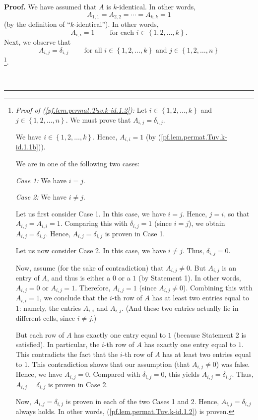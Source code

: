 \documentclass[numbers=enddot,12pt,final,onecolumn,notitlepage]{scrartcl}%
\theoremstyle{definition}
\newenvironment{proof}[1][Proof]{\noindent\textbf{#1.} }{\ \rule{0.5em}{0.5em}}
\begin{document}
\begin{proof}
We have assumed that $A$ is $k$-identical. In other words,%
\begin{equation}
A_{1,1}=A_{2,2}=\cdots=A_{k,k}=1 \label{pf.lem.permat.Tuv.k-id.1.1}%
\end{equation}
(by the definition of \textquotedblleft$k$-identical\textquotedblright). In
other words,%
\begin{equation}
A_{i,i}=1\ \ \ \ \ \ \ \ \ \ \text{for each }i\in\left\{  1,2,\ldots
,k\right\}  . \label{pf.lem.permat.Tuv.k-id.1.1b}%
\end{equation}
Next, we observe that%
\begin{equation}
A_{i,j}=\delta_{i,j}\ \ \ \ \ \ \ \ \ \ \text{for all }i\in\left\{
1,2,\ldots,k\right\}  \text{ and }j\in\left\{  1,2,\ldots,n\right\}
\label{pf.lem.permat.Tuv.k-id.1.2}%
\end{equation}
\footnote{\textit{Proof of (\ref{pf.lem.permat.Tuv.k-id.1.2}):} Let
$i\in\left\{  1,2,\ldots,k\right\}  $ and $j\in\left\{  1,2,\ldots,n\right\}
$. We must prove that $A_{i,j}=\delta_{i,j}$.
\par
We have $i\in\left\{  1,2,\ldots,k\right\}  $. Hence, $A_{i,i}=1$ (by
(\ref{pf.lem.permat.Tuv.k-id.1.1b})).
\par
We are in one of the following two cases:
\par
\textit{Case 1:} We have $i=j$.
\par
\textit{Case 2:} We have $i\neq j$.
\par
Let us first consider Case 1. In this case, we have $i=j$. Hence, $j=i$, so
that $A_{i,j}=A_{i,i}=1$. Comparing this with $\delta_{i,j}=1$ (since $i=j$),
we obtain $A_{i,j}=\delta_{i,j}$. Hence, $A_{i,j}=\delta_{i,j}$ is proven in
Case 1.
\par
Let us now consider Case 2. In this case, we have $i\neq j$. Thus,
$\delta_{i,j}=0$.
\par
Now, assume (for the sake of contradiction) that $A_{i,j}\neq0$. But $A_{i,j}$
is an entry of $A$, and thus is either a $0$ or a $1$ (by Statement 1). In
other words, $A_{i,j}=0$ or $A_{i,j}=1$. Therefore, $A_{i,j}=1$ (since
$A_{i,j}\neq0$). Combining this with $A_{i,i}=1$, we conclude that the $i$-th
row of $A$ has at least two entries equal to $1$: namely, the entries
$A_{i,i}$ and $A_{i,j}$. (And these two entries actually lie in different
cells, since $i\neq j$.)
\par
But each row of $A$ has exactly one entry equal to $1$ (because Statement 2 is
satisfied). In particular, the $i$-th row of $A$ has exactly one entry equal
to $1$. This contradicts the fact that the $i$-th row of $A$ has at least two
entries equal to $1$. This contradiction shows that our assumption (that
$A_{i,j}\neq0$) was false. Hence, we have $A_{i,j}=0$. Compared with
$\delta_{i,j}=0$, this yields $A_{i,j}=\delta_{i,j}$. Thus, $A_{i,j}%
=\delta_{i,j}$ is proven in Case 2.
\par
Now, $A_{i,j}=\delta_{i,j}$ is proven in each of the two Cases 1 and 2. Hence,
$A_{i,j}=\delta_{i,j}$ always holds. In other words,
(\ref{pf.lem.permat.Tuv.k-id.1.2}) is proven.}.


\end{proof}
\end{document}
